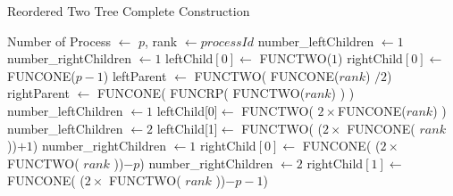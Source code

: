 \documentclass[sigplan,review,anonymous]{acmart}\settopmatter{printfolios=true,printccs=false,printacmref=false}
\begin{document}
\begin{algorithm}[htp]
\scriptsize
\caption{Reordered Two Tree Complete Construction}\label{alg:ReorderedTwoTree}
\SetAlgoLined\DontPrintSemicolon
{}

\myalg{\algo{}} {
\begin{algorithmic}[1]
\REQUIRE Number of Process $\leftarrow$ \(p\), rank $\leftarrow processId$ 
    \STATE number\_leftChildren $ \leftarrow 1$
    \STATE number\_rightChildren $ \leftarrow 1$
    \STATE leftChild$[0] \leftarrow$ FUNCTWO($1$)
    \STATE rightChild$[0] \leftarrow$ FUNCONE($p-1$)
    \STATE leftParent $ \leftarrow$ FUNCTWO\big( FUNCONE($rank$) $ / 2$\big)
    \STATE rightParent $ \leftarrow$ FUNCONE\Big( FUNCRP\big( FUNCTWO($rank$) \big) \Big)
         \STATE number\_leftChildren $ \leftarrow 1$
         \STATE leftChild[0]$ \leftarrow$ FUNCTWO\big( $2 \times $FUNCONE($rank$) \big)
    \ENDIF
         \STATE number\_leftChildren $ \leftarrow 2$
         \STATE leftChild[1]$ \leftarrow$ FUNCTWO\Big( \big($2 \times$ FUNCONE( $rank$ )\big)$+1$\Big)
    \ENDIF
         \STATE number\_rightChildren $ \leftarrow 1$
         \STATE rightChild$[0] \leftarrow$ FUNCONE\Big( \big($2 \times$ FUNCTWO( $rank$ )\big)$ - p$\Big)
    \ENDIF
         \STATE number\_rightChildren $ \leftarrow 2$
         \STATE rightChild$[1] \leftarrow$ FUNCONE\Big( \big($2 \times$ FUNCTWO( $rank$ )\big)$-p-1$\Big)
    \ENDIF
\ENDIF
\end{algorithmic}}
\end{algorithm}
\end{document}
